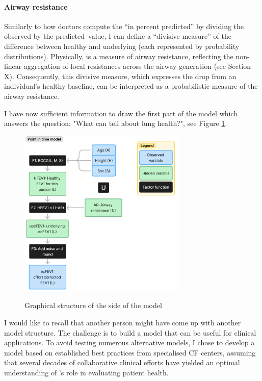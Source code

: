 \paragraph{Airway resistance}
Similarly to how doctors compute the “\F in percent predicted” by dividing the observed \F by the predicted\ value, I can define a “divisive measure” of the difference between healthy and underlying \F (each represented by probability distributions). Physically, \F is a measure of airway resistance, reflecting the non-linear aggregation of local resistances across the airway generation (see Section X). Consequently, this divisive measure, which expresses the drop from an individual's healthy \F baseline, can be interpreted as a probabilistic measure of the airway resistance.

I have now sufficient information to draw the first part of the model which answers the question: "What can \F tell about lung health?", see Figure \ref{graph:fev1_side}.

\begin{figure}[!h]
    \caption{Graphical structure of the \F side of the model}
    \centering
    \includegraphics[width=80mm]{Chapter1/Figs/fev1_side_model_structure.png}
    \label{graph:fev1_side}
\end{figure}

I would like to recall that another person might have come up with another model structure. The challenge is to build a model that can be useful for clinical applications. To avoid testing numerous alternative models, I chose to develop a model based on established best practices from specialised CF centers, assuming that several decades of collaborative clinical efforts have yielded an optimal understanding of \F’s role in evaluating patient health.

